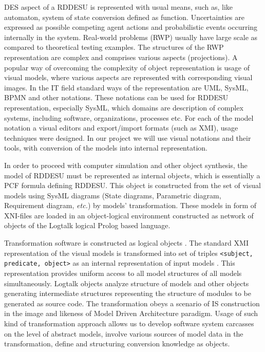 \documentclass[conference]{IEEEtran}
\begin{document}
DES aspect of a RDDESU is represented with usual means, such as, like automaton, system of state conversion defined as function.  Uncertainties are expressed as possible competing agent actions and probabilistic events occurring internally in the system.  Real-world problems (RWP) usually have large scale as compared to theoretical testing examples. The structures of the RWP representation are complex and comprises various aspects (projections). A popular way of overcoming the complexity of object representation is usage of visual models, where various aspects are represented with corresponding visual images. In the IT field standard ways of the representation are UML, SysML, BPMN and other notations. These notations can be used for RDDESU representation, especially SysML, which domains are description of complex systems, including software, organizations, processes etc. For each of the model notation a visual editors and export/import formats (such as XMI), usage techniques were designed. In our project we will use visual notations and their tools, with conversion of the models into internal representation.

In order to proceed with computer simulation and other object synthesis, the model of RDDESU must be represented as internal objects, which is essentially a PCF formula defining RDDESU. This object is constructed from the set of visual models using SysML diagrams (State diagrams, Parametric diagram, Requirement diagram, \emph{etc.}) by models' transformation. These models in form of XNI-files are loaded in an object-logical environment constructed as network of objects of the Logtalk logical Prolog based language. %

Transformation software is constructed as logical objects \cite{b3}. The standard XMI representation of the visual models is transformed into set of triples \texttt{<subject, predicate, object>} as an internal representation of input models \cite{b2}. This representation provides uniform access to all model structures of all models simultaneously. %
Logtalk objects analyze structure of models and other objects generating intermediate structures representing the structure of modules to be generated as source code. The transformation obeys a scenario of IS construction in the image and likeness of Model Driven Architecture paradigm. Usage of such kind of transformation approach allows us to develop software system carcasses on the level of abstract models, involve various sources of model data in the transformation, define and structuring conversion knowledge as objects.
\end{document}
